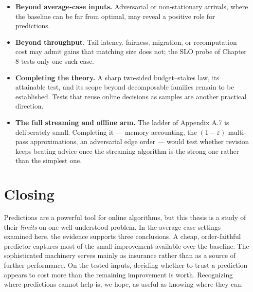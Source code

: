 \begin{itemize}
\tightlist
\item
  \textbf{Beyond average-case inputs.} Adversarial or non-stationary
  arrivals, where the baseline can be far from optimal, may reveal a
  positive role for predictions.
\item
  \textbf{Beyond throughput.} Tail latency, fairness, migration, or
  recomputation cost may admit gains that matching size does not; the
  SLO probe of Chapter 8 tests only one such case.
\item
  \textbf{Completing the theory.} A sharp two-sided budget--stakes law,
  its attainable test, and its scope beyond decomposable families remain
  to be established. Tests that reuse online decisions as samples are
  another practical direction.
\item
  \textbf{The full streaming and offline arm.} The ladder of Appendix
  A.7 is deliberately small. Completing it --- memory accounting, the
  \((1-\varepsilon)\) multi-pass approximations, an adversarial edge
  order --- would test whether revision keeps beating advice once the
  streaming algorithm is the strong one rather than the simplest one.
\end{itemize}

\section{Closing}

Predictions are a powerful tool for online algorithms, but this thesis
is a study of their \emph{limits} on one well-understood problem. In the
average-case settings examined here, the evidence supports three
conclusions. A cheap, order-faithful predictor captures most of the
small improvement available over the baseline. The sophisticated
machinery serves mainly as insurance rather than as a source of further
performance. On the tested inputs, deciding whether to trust a
prediction appears to cost more than the remaining improvement is worth.
Recognizing where predictions cannot help is, we hope, as useful as
knowing where they can.
